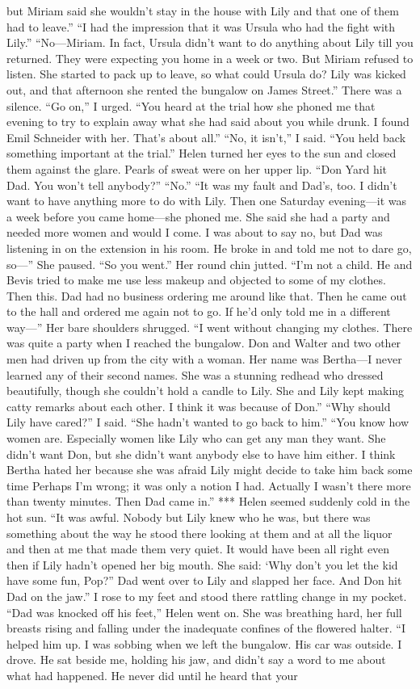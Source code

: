 \documentclass{novel}
\begin{document}
but Miriam said she wouldn’t stay in the house with Lily and that one of them had to leave.” “I had the impression that it was Ursula who had the fight with Lily.” “No—Miriam. In fact, Ursula didn’t want to do anything about Lily till you returned. They were expecting you home in a week or two. But Miriam refused to listen. She started to pack up to leave, so what could Ursula do? Lily was kicked out, and that afternoon she rented the bungalow on James Street.” There was a silence. “Go on,” I urged. “You heard at the trial how she phoned me that evening to try to explain away what she had said about you while drunk. I found Emil Schneider with her. That’s about all.” “No, it isn’t,” I said. “You held back something important at the trial.” Helen turned her eyes to the sun and closed them against the glare. Pearls of sweat were on her upper lip. “Don Yard hit Dad. You won’t tell anybody?” “No.” “It was my fault and Dad’s, too. I didn’t want to have anything more to do with Lily. Then one Saturday evening—it was a week before you came home—she phoned me. She said she had a party and needed more women and would I come. I was about to say no, but Dad was listening in on the extension in his room. He broke in and told me not to dare go, so—” She paused. “So you went.” Her round chin jutted. “I’m not a child. He and Bevis tried to make me use less makeup and objected to some of my clothes. Then this. Dad had no business ordering me around like that. Then he came out to the hall and ordered me again not to go. If he’d only told me in a different way—” Her bare shoulders shrugged. “I went without changing my clothes. There was quite a party when I reached the bungalow. Don and Walter and two other men had driven up from the city with a woman. Her name was Bertha—I never learned any of their second names. She was a stunning redhead who dressed beautifully, though she couldn’t hold a candle to Lily. She and Lily kept making catty remarks about each other. I think it was because of Don.” “Why should Lily have cared?” I said. “She hadn’t wanted to go back to him.” “You know how women are. Especially women like Lily who can get any man they want. She didn’t want Don, but she didn’t want anybody else to have him either. I think Bertha hated her because she was afraid Lily might decide to take him back some time Perhaps I’m wrong; it was only a notion I had. Actually I wasn’t there more than twenty minutes. Then Dad came in.” *** Helen seemed suddenly cold in the hot sun. “It was awful. Nobody but Lily knew who he was, but there was something about the way he stood there looking at them and at all the liquor and then at me that made them very quiet. It would have been all right even then if Lily hadn’t opened her big mouth. She said: ‘Why don’t you let the kid have some fun, Pop?” Dad went over to Lily and slapped her face. And Don hit Dad on the jaw.” I rose to my feet and stood there rattling change in my pocket. “Dad was knocked off his feet,” Helen went on. She was breathing hard, her full breasts rising and falling under the inadequate confines of the flowered halter. “I helped him up. I was sobbing when we left the bungalow. His car was outside. I drove. He sat beside me, holding his jaw, and didn’t say a word to me about what had happened. He never did until he heard that your 
\end{document}
